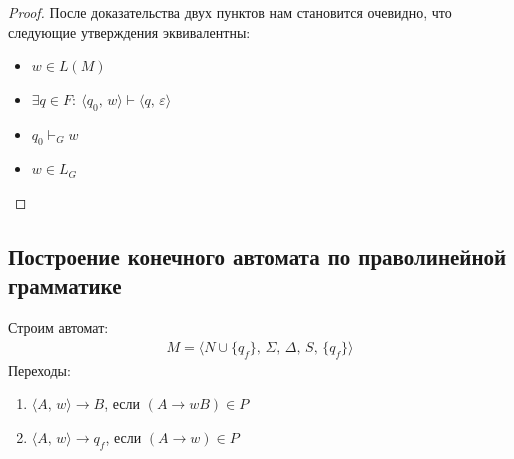 \documentclass[a4paper,12pt]{article}
\theoremstyle{plain}
\theoremstyle{definition}
\theoremstyle{remark}
\begin{document}
\begin{proof}
	После доказательства двух пунктов нам становится очевидно, что следующие утверждения эквивалентны:
	\begin{itemize}
		\item $w \in L(M)$
		\item $\exists q \in F :\: \langle q_0,\, w\rangle \vdash \langle q,\, \varepsilon\rangle$
		\item $q_0 \vdash_G w$
		\item $w \in L_G$
	\end{itemize}
\end{proof}

\subsection{Построение конечного автомата по праволинейной грамматике}
Строим автомат:
\begin{align*}
	M = \langle N \cup \{q_f\},\, \Sigma,\, \Delta,\, S,\, \{q_f\}\rangle
\end{align*}
Переходы:
\begin{enumerate}
	\item $\langle A,\, w\rangle \to B$, если $(A \to wB) \in P$
	\item $\langle A,\, w\rangle \to q_f$, если $(A \to w) \in P$
\end{enumerate}
\end{document}
